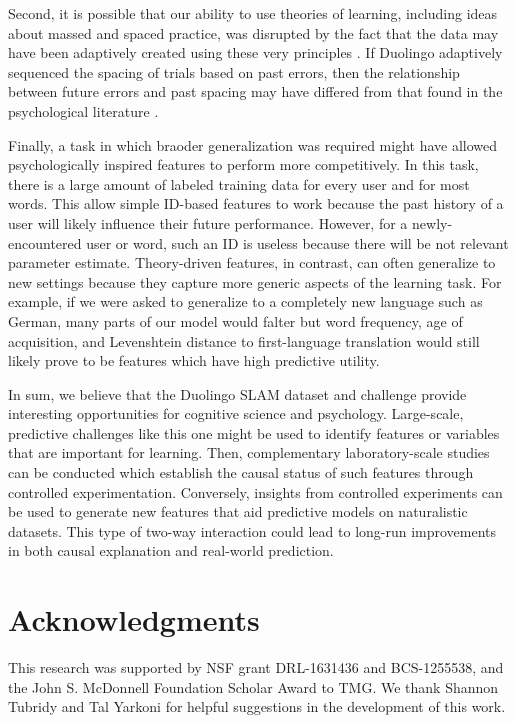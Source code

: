 \documentclass[11pt,a4paper]{article}
\begin{document}
Second, it is possible that our ability to use theories of learning, including
ideas about massed and spaced practice, was disrupted by the fact that the data
may have been adaptively created using these very principles
\cite{settles2016trainable}. If Duolingo adaptively sequenced the spacing of
trials based on past errors, then the relationship between future errors and
past spacing may have differed from that found in the psychological literature
\cite{Cepeda:2006aa}.

Finally, a task in which braoder generalization was required might have
allowed psychologically inspired features to perform more competitively. In this
task, there is a large amount of labeled training data for every user and for
most words. This allow simple ID-based features to work because the past
history of a user will likely influence their future performance. However, for a
newly-encountered user or word, such an ID is useless because there will be
not relevant parameter estimate. Theory-driven features, in
contrast, can often generalize to new settings because they capture more
generic aspects of the learning task.  For example, if we were asked to generalize to
a completely new language such as German, many parts of our model would falter
but word frequency, age of acquisition, and Levenshtein distance to
first-language translation would still likely prove to be features which
have high predictive utility.

In sum, we believe that the Duolingo SLAM dataset and challenge provide
interesting opportunities for cognitive science and psychology. 
Large-scale, predictive challenges like this one
might be used to identify features or variables that are important for learning.
Then, complementary laboratory-scale studies can be conducted which
establish the causal status of such features through controlled experimentation.
Conversely, insights from controlled experiments can be used to generate
new features that aid predictive models on naturalistic datasets. This type of
two-way interaction could lead to long-run improvements in both causal
explanation and real-world prediction.

\section{Acknowledgments}
This research was supported by NSF grant DRL-1631436 and BCS-1255538,
and the John S. McDonnell Foundation Scholar Award to TMG.  We thank
Shannon Tubridy and Tal Yarkoni for helpful suggestions in the development
of this work.



\end{document}
